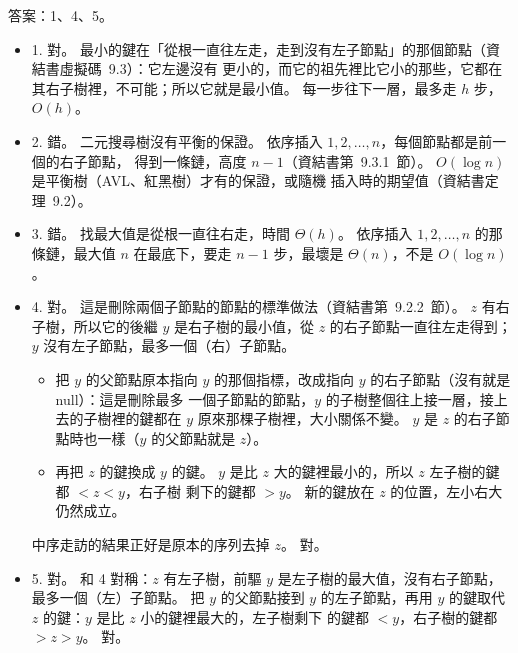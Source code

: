 \begin{pastsoln}
答案：1、4、5。

\begin{itemize}
\item 1. 對。 最小的鍵在「從根一直往左走，走到沒有左子節點」的那個節點（資結書虛擬碼~9.3）：它左邊沒有
更小的，而它的祖先裡比它小的那些，它都在其右子樹裡，不可能；所以它就是最小值。 每一步往下一層，最多走
$h$ 步，$O(h)$。
\item 2. 錯。 二元搜尋樹沒有平衡的保證。 依序插入 $1, 2, \ldots, n$，每個節點都是前一個的右子節點，
得到一條鏈，高度 $n - 1$（資結書第~9.3.1~節）。 $O(\log n)$ 是平衡樹（AVL、紅黑樹）才有的保證，或隨機
插入時的期望值（資結書定理~9.2）。
\item 3. 錯。 找最大值是從根一直往右走，時間 $\Theta(h)$。 依序插入 $1, 2, \ldots, n$ 的那條鏈，最大值
$n$ 在最底下，要走 $n - 1$ 步，最壞是 $\Theta(n)$，不是 $O(\log n)$。
\item 4. 對。 這是刪除兩個子節點的節點的標準做法（資結書第~9.2.2~節）。 $z$ 有右子樹，所以它的後繼
$y$ 是右子樹的最小值，從 $z$ 的右子節點一直往左走得到；$y$ 沒有左子節點，最多一個（右）子節點。
\begin{itemize}
\item 把 $y$ 的父節點原本指向 $y$ 的那個指標，改成指向 $y$ 的右子節點（沒有就是 null）：這是刪除最多
一個子節點的節點，$y$ 的子樹整個往上接一層，接上去的子樹裡的鍵都在 $y$ 原來那棵子樹裡，大小關係不變。
$y$ 是 $z$ 的右子節點時也一樣（$y$ 的父節點就是 $z$）。
\item 再把 $z$ 的鍵換成 $y$ 的鍵。 $y$ 是比 $z$ 大的鍵裡最小的，所以 $z$ 左子樹的鍵都 $< z < y$，右子樹
剩下的鍵都 $> y$。 新的鍵放在 $z$ 的位置，左小右大仍然成立。
\end{itemize}
中序走訪的結果正好是原本的序列去掉 $z$。 對。
\item 5. 對。 和 4 對稱：$z$ 有左子樹，前驅 $y$ 是左子樹的最大值，沒有右子節點，最多一個（左）子節點。
把 $y$ 的父節點接到 $y$ 的左子節點，再用 $y$ 的鍵取代 $z$ 的鍵：$y$ 是比 $z$ 小的鍵裡最大的，左子樹剩下
的鍵都 $< y$，右子樹的鍵都 $> z > y$。 對。
\end{itemize}
\end{pastsoln}
